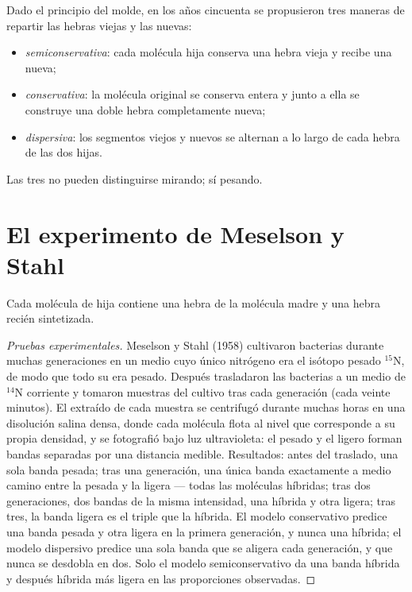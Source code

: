 \begin{example}\label{ex:g11:dna-replication:models}
Dado el principio del molde, en los años cincuenta se propusieron tres
maneras de repartir las hebras viejas y las nuevas:
\begin{itemize}
  \item \emph{semiconservativa}: cada molécula hija conserva una hebra
        vieja y recibe una nueva;
  \item \emph{conservativa}: la molécula original se conserva entera y
        junto a ella se construye una doble hebra completamente nueva;
  \item \emph{dispersiva}: los segmentos viejos y nuevos se alternan a
        lo largo de cada hebra de las dos hijas.
\end{itemize}
Las tres no pueden distinguirse mirando; sí pesando.
\end{example}

\section{El experimento de Meselson y Stahl}

\begin{proposition}\label{prop:g11:dna-replication:semiconservative}
Cada molécula de  hija contiene una hebra de la molécula madre y
una hebra recién sintetizada.
\end{proposition}
\begin{proof}[Pruebas experimentales]
Meselson y Stahl (1958) cultivaron bacterias durante muchas
generaciones en un medio cuyo único nitrógeno era el isótopo pesado
$^{15}$N, de modo que todo su  era pesado. Después trasladaron las
bacterias a un medio de $^{14}$N corriente y tomaron muestras del
cultivo tras cada generación (cada veinte minutos). El  extraído de
cada muestra se centrifugó durante muchas horas en una disolución
salina densa, donde cada molécula flota al nivel que corresponde a su
propia densidad, y se fotografió bajo luz ultravioleta: el  pesado y
el ligero forman bandas separadas por una distancia medible.
Resultados: antes del traslado, una sola banda pesada; tras una
generación, una única banda exactamente a medio camino entre la pesada
y la ligera --- todas las moléculas híbridas; tras dos generaciones,
dos bandas de la misma intensidad, una híbrida y otra ligera; tras
tres, la banda ligera es el triple que la híbrida. El modelo
conservativo predice una banda pesada y otra ligera en la primera
generación, y nunca una híbrida; el modelo dispersivo predice una sola
banda que se aligera cada generación, y que nunca se desdobla en dos.
Solo el modelo semiconservativo da una banda híbrida y después híbrida
más ligera en las proporciones observadas.
\end{proof}

